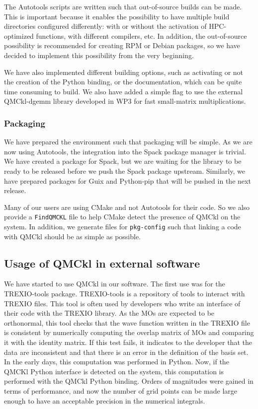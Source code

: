 The Autotools scripts are written such that out-of-source builds can
be made. This is important because it enables the possibility to have
multiple build directories configured differently: with or without the
activation of HPC-optimized functions, with different compilers, etc.
In addition, the out-of-source possibility is recommended for creating RPM
or Debian packages, so we have decided to implement this possibility
from the very beginning.

We have also implemented different building options, such as
activating or not the creation of the Python binding, or the
documentation, which can be quite time consuming to build. We also have
added a simple flag to use the external QMCkl-dgemm library developed in WP3 for
fast small-matrix multiplications.

\subsubsection{Packaging}

We have prepared the environment such that packaging will be
simple. As we are now using Autotools, the integration into the Spack
package manager\cite{spack} is trivial. We have created a package for Spack, but
we are waiting for the library to be ready to be released before we
push the Spack package upstream.
Similarly, we have prepared packages for Guix\cite{guix} and Python-pip that
will be pushed in the next release.

Many of our users are using CMake and not Autotools for their code. So
we also provide a \texttt{FindQMCKL} file to help CMake detect
the presence of QMCkl on the system. In addition, we generate files for
\texttt{pkg-config} such that linking a code with QMCkl should be as
simple as possible.

\subsection{Usage of QMCkl in external software}

We have started to use QMCkl in our software. The first use was for
the TREXIO-tools package.
TREXIO-tools is a repository of tools to interact with TREXIO files.
This tool is often used by developers who write an interface of their code with
the TREXIO library. As the \acp{MO} are expected to be orthonormal,
this tool checks that the wave function written in the TREXIO file is
consistent by numerically computing the overlap matrix of \acp{MO} and
comparing it with the identity matrix. If this test fails, it indicates to the
developer that the data are inconsistent and that there is an error in the
definition of the basis set.
In the early days, this computation was performed in Python. Now, if
the QMCKl Python interface is detected on the system, this computation
is performed with the QMCkl Python binding. Orders of magnitudes were
gained in terms of performance, and now the number of grid points can be made large enough to have an acceptable precision in the
numerical integrals.

